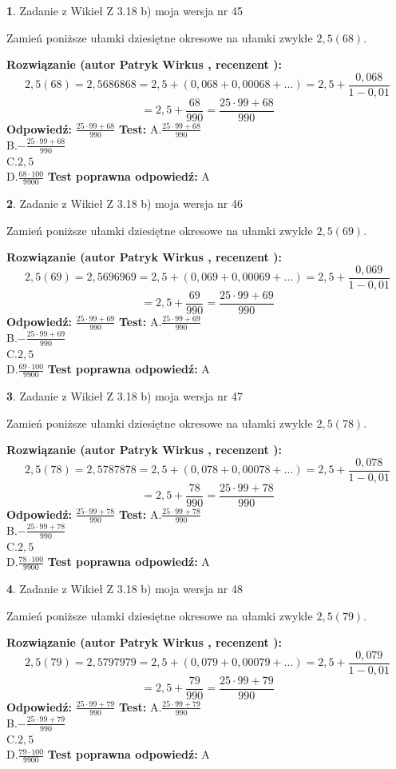 \documentclass[12pt, a4paper]{article}
\theoremstyle{definition} %
\newtheorem{zad}{}
\newcommand{\zadStart}[1]{\begin{zad}#1\newline}
\newcommand{\zadStop}{\end{zad}}
\newcommand{\rozwStart}[2]{\noindent \textbf{Rozwiązanie (autor #1 , recenzent #2): }\newline}
\newcommand{\rozwStop}{\newline}
\newcommand{\odpStart}{\noindent \textbf{Odpowiedź:}\newline}
\newcommand{\odpStop}{\newline}
\newcommand{\testStart}{\noindent \textbf{Test:}\newline}
\newcommand{\testStop}{\newline}
\newcommand{\kluczStart}{\noindent \textbf{Test poprawna odpowiedź:}\newline}
\newcommand{\kluczStop}{\newline}
\begin{document}
\zadStart{Zadanie z Wikieł Z 3.18 b) moja wersja nr 45}

Zamień poniższe ułamki dziesiętne okresowe na ułamki zwykłe $2,5(68)$.
\zadStop
\rozwStart{Patryk Wirkus}{}
$$2,5(68)=2,5686868=2,5+(0,068+0,00068+...)=2,5+\frac{0,068}{1-0,01}$$
$$=2,5+\frac{68}{990}=\frac{25\cdot99+68}{990}$$
\rozwStop
\odpStart
$\frac{25\cdot99+68}{990}$
\odpStop
\testStart
A.$\frac{25\cdot99+68}{990}$\\ B.$-\frac{25\cdot99+68}{990}$\\ C.$2,5$\\ D.$\frac{68\cdot100}{9900}$
\testStop
\kluczStart
A
\kluczStop



\zadStart{Zadanie z Wikieł Z 3.18 b) moja wersja nr 46}

Zamień poniższe ułamki dziesiętne okresowe na ułamki zwykłe $2,5(69)$.
\zadStop
\rozwStart{Patryk Wirkus}{}
$$2,5(69)=2,5696969=2,5+(0,069+0,00069+...)=2,5+\frac{0,069}{1-0,01}$$
$$=2,5+\frac{69}{990}=\frac{25\cdot99+69}{990}$$
\rozwStop
\odpStart
$\frac{25\cdot99+69}{990}$
\odpStop
\testStart
A.$\frac{25\cdot99+69}{990}$\\ B.$-\frac{25\cdot99+69}{990}$\\ C.$2,5$\\ D.$\frac{69\cdot100}{9900}$
\testStop
\kluczStart
A
\kluczStop



\zadStart{Zadanie z Wikieł Z 3.18 b) moja wersja nr 47}

Zamień poniższe ułamki dziesiętne okresowe na ułamki zwykłe $2,5(78)$.
\zadStop
\rozwStart{Patryk Wirkus}{}
$$2,5(78)=2,5787878=2,5+(0,078+0,00078+...)=2,5+\frac{0,078}{1-0,01}$$
$$=2,5+\frac{78}{990}=\frac{25\cdot99+78}{990}$$
\rozwStop
\odpStart
$\frac{25\cdot99+78}{990}$
\odpStop
\testStart
A.$\frac{25\cdot99+78}{990}$\\ B.$-\frac{25\cdot99+78}{990}$\\ C.$2,5$\\ D.$\frac{78\cdot100}{9900}$
\testStop
\kluczStart
A
\kluczStop



\zadStart{Zadanie z Wikieł Z 3.18 b) moja wersja nr 48}

Zamień poniższe ułamki dziesiętne okresowe na ułamki zwykłe $2,5(79)$.
\zadStop
\rozwStart{Patryk Wirkus}{}
$$2,5(79)=2,5797979=2,5+(0,079+0,00079+...)=2,5+\frac{0,079}{1-0,01}$$
$$=2,5+\frac{79}{990}=\frac{25\cdot99+79}{990}$$
\rozwStop
\odpStart
$\frac{25\cdot99+79}{990}$
\odpStop
\testStart
A.$\frac{25\cdot99+79}{990}$\\ B.$-\frac{25\cdot99+79}{990}$\\ C.$2,5$\\ D.$\frac{79\cdot100}{9900}$
\testStop
\kluczStart
A
\kluczStop
\end{document}
